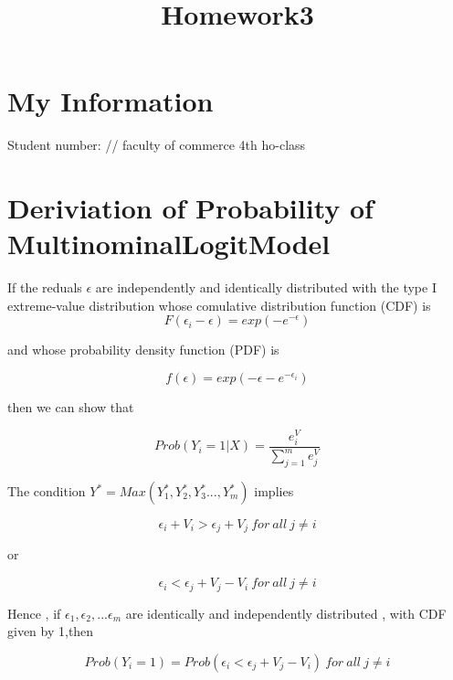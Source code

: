 \documentclass[dvipdfmx]{jsarticle}
\begin{document}
\title{Homework3}
\author{}
\maketitle

\section{My Information}
Student number:
//
faculty of commerce 4th
ho-class
\section{Deriviation of Probability of MultinominalLogitModel}

If the reduals $\epsilon$ are independently and identically distributed with the type I extreme-value distribution whose comulative distribution function (CDF) is
\begin{equation}
  F(\epsilon_i - \epsilon) = exp(-e^{-\epsilon})
\end{equation}

and whose probability density function (PDF) is

\begin{equation}
  f(\epsilon) = exp(-\epsilon - e^{-\epsilon_i})
\end{equation}

then we can show that

\begin{equation}
  Prob(Y_i = 1 | X) = \frac{e^V_i}{\sum_{j=1}^{m}e^V_j}
\end{equation}

The condition $Y^*=Max(Y^*_1, Y^*_2, Y^*_3..., Y^*_m)$
implies

\begin{equation}
 \epsilon_i + V_i > \epsilon_j + V_j　\  for \ all \ j \neq i
\end{equation}

or

\begin{equation}
 \epsilon_i <  \epsilon_j + V_j - V_i  \  for \  all \  j \neq i
\end{equation}

Hence , if $\epsilon_1, \epsilon_2, ... \epsilon_m $ are identically and independently distributed , with CDF given by 1,then


\begin{equation}
  Prob(Y_i = 1) = Prob(\epsilon_i <  \epsilon_j + V_j - V_i ) \  for \  all \  j \neq i
 \end{equation}
\end{document}
